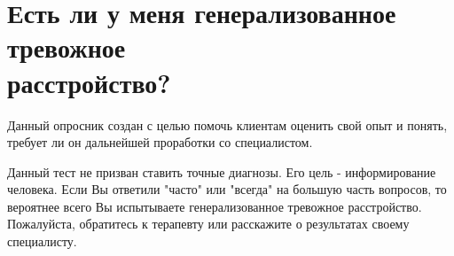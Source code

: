 \documentclass{../../shared/survey}
\begin{document}
\section*{\huge{Есть ли у меня генерализованное тревожное \\ расстройство?}}

\begin{flushleft}
Данный опросник создан с целью помочь клиентам оценить свой опыт и понять, требует ли он дальнейшей проработки со специалистом.
\end{flushleft}







\begin{flushleft}
Данный тест не призван ставить точные диагнозы. Его цель - информирование человека. Если Вы ответили "часто" или "всегда" на большую часть вопросов, то вероятнее всего Вы испытываете генерализованное тревожное расстройство. Пожалуйста, обратитесь к терапевту или расскажите о результатах своему специалисту.
\end{flushleft}
\end{document}
